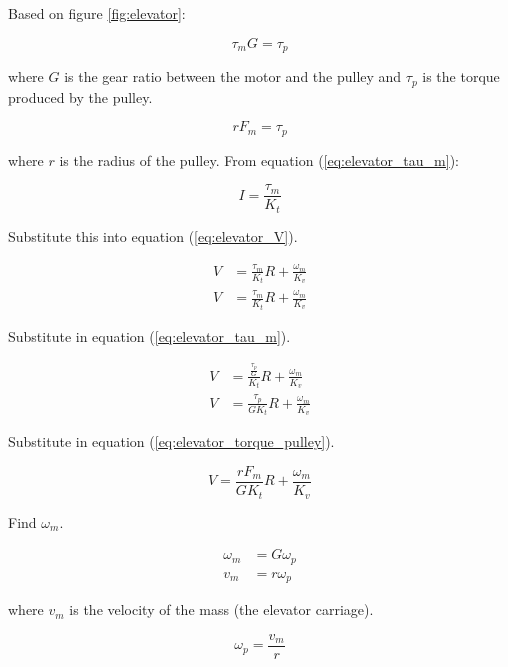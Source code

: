 Based on figure \ref{fig:elevator}:

\begin{equation}
  \tau_m G = \tau_p \label{eq:elevator_tau_m_ratio}
\end{equation}

where $G$ is the gear ratio between the motor and the pulley and $\tau_p$ is the
torque produced by the pulley.

\begin{equation}
  rF_m = \tau_p \label{eq:elevator_torque_pulley}
\end{equation}

where $r$ is the radius of the pulley. From equation (\ref{eq:elevator_tau_m}):

\begin{equation}
  I = \frac{\tau_m}{K_t}
\end{equation}

Substitute this into equation (\ref{eq:elevator_V}).

\begin{align*}
  V &= \frac{\tau_m}{K_t} R + \frac{\omega_m}{K_v} \\
  V &= \frac{\tau_m}{K_t} R + \frac{\omega_m}{K_v}
\end{align*}

Substitute in equation (\ref{eq:elevator_tau_m}).

\begin{align*}
  V &= \frac{\frac{\tau_p}{G}}{K_t} R + \frac{\omega_m}{K_v} \\
  V &= \frac{\tau_p}{GK_t} R + \frac{\omega_m}{K_v}
\end{align*}

Substitute in equation (\ref{eq:elevator_torque_pulley}).

\begin{equation}
  V = \frac{rF_m}{GK_t} R + \frac{\omega_m}{K_v} \label{eq:elevator_Vinter1}
\end{equation}

Find $\omega_m$.

\begin{align}
  \omega_m &= G \omega_p \label{eq:elevator_omega_m_ratio} \\
  v_m &= r \omega_p \nonumber
\end{align}

where $v_m$ is the velocity of the mass (the elevator carriage).

\begin{equation}
  \omega_p = \frac{v_m}{r} \label{eq:elevator_omega_p}
\end{equation}

